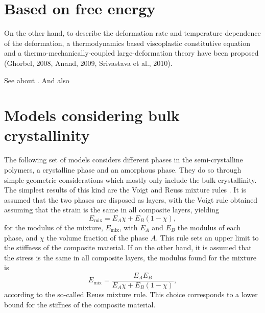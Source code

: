 \section{Based on free energy}

On the other hand, to describe the
deformation rate and temperature dependence of the deformation, a thermodynamics based
viscoplastic constitutive equation and a thermo-mechanically-coupled large-deformation theory have
been proposed (Ghorbel, 2008, Anand, 2009, Srivastava et al., 2010). \cite{uchidaMicroMesoMacroscopic2013}

\colorbox{BrickRed}{See about \cite{anandTheoryAmorphousSolids2003}. And also \cite{ghorbelViscoplasticConstitutiveModel2008,anandThermomechanicallyCoupledTheory2009, amesThermomechanicallyCoupledTheory2009, pouriayevaliConstitutiveDescriptionRatesensitive2013}}

\section{Models considering bulk crystallinity}
\label{sec:models_bulk_crystal}

The following set of models considers different phases in the semi-crystalline polymers, a crystalline phase and an amorphous phase.
They do so through simple geometric considerations which mostly only include the bulk crystallinity.
The simplest results of this kind are the Voigt and Reuss mixture rules \citep{wardIntroductionMechanicalProperties2004}.
It is assumed that the two phases are disposed as layers, with the Voigt rule obtained assuming that the strain is the same in all composite layers, yielding
\begin{equation}
	\label{eq:voigt_mixture_rule}
	E_\text{mix} = E_A \chi + E_B (1 - \chi),
\end{equation}
for the modulus of the mixture, $E_\text{mix}$, with $E_A$ and $E_B$ the modulus of each phase, and $\chi$ the volume fraction of the phase $A$.
This rule sets an upper limit to the stiffness of the composite material.
If on the other hand, it is assumed that the stress is the same in all composite layers, the modulus found for the mixture is
\begin{equation}
	E_\text{mix} = \frac{E_A E_B}{E_A \chi + E_B (1-\chi)},
\end{equation}
according to the so-called Reuss mixture rule.
This choice corresponds to a lower bound for the stiffnes of the composite material.

